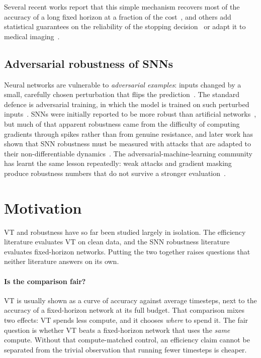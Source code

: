 Several recent works report that this simple mechanism recovers most of the accuracy of a long fixed horizon at a fraction of the cost~\cite{li2023unleashing, li2023input}, and others add statistical guarantees on the reliability of the stopping decision~\cite{chen2025knowing} or adapt it to medical imaging~\cite{rao2025vtsnn}.

\subsection{Adversarial robustness of SNNs}

Neural networks are vulnerable to \emph{adversarial examples}: inputs changed by a small, carefully chosen perturbation that flips the prediction~\cite{szegedy2014intriguing, goodfellow2015explaining}. The standard defence is adversarial training, in which the model is trained on such perturbed inputs~\cite{madry2018towards}. SNNs were initially reported to be more robust than artificial networks~\cite{sharmin2019comprehensive, sharmin2020inherent}, but much of that apparent robustness came from the difficulty of computing gradients through spikes rather than from genuine resistance, and later work has shown that SNN robustness must be measured with attacks that are adapted to their non-differentiable dynamics~\cite{liang2022toward, wang2026towards}. The adversarial-machine-learning community has learnt the same lesson repeatedly: weak attacks and gradient masking produce robustness numbers that do not survive a stronger evaluation~\cite{athalye2018obfuscated, tramer2020adaptive, croce2020reliable}.

\section{Motivation}
\label{sec:intro-motivation}

VT and robustness have so far been studied largely in isolation. The efficiency literature evaluates VT on clean data, and the SNN robustness literature evaluates fixed-horizon networks. Putting the two together raises questions that neither literature answers on its own.

\paragraph{Is the comparison fair?} VT is usually shown as a curve of accuracy against average timesteps, next to the accuracy of a fixed-horizon network at its full budget. That comparison mixes two effects: VT spends less compute, and it chooses \emph{where} to spend it. The fair question is whether VT beats a fixed-horizon network that uses the \emph{same} compute. Without that compute-matched control, an efficiency claim cannot be separated from the trivial observation that running fewer timesteps is cheaper.

